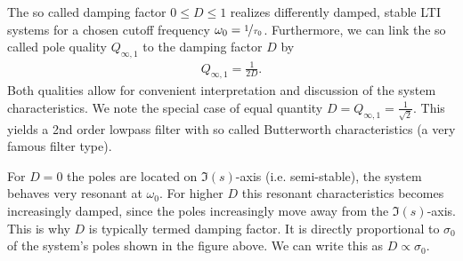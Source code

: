 \begin{mdframed}
The so called damping factor $0\leq D \leq 1$ realizes differently damped,
stable LTI systems for a chosen cutoff frequency $\omega_0=\nicefrac{1}{\tau_0}$.
Furthermore, we can link the so called pole quality $Q_{\infty,1} $ to the damping factor
$D$ by
\begin{align}
Q_{\infty,1} = \frac{1}{2 D}.
\end{align}
Both qualities allow for convenient interpretation and discussion of the
system characteristics. We note the special case of equal quantity
$D = Q_{\infty,1} = \frac{1}{\sqrt{2}}$. This yields a 2nd order
lowpass filter with so called Butterworth characteristics (a very famous filter type).
\begin{center}
%
\end{center}
%
For $D=0$ the poles are located on $\Im(s)$-axis (i.e. semi-stable),
the system behaves very resonant at $\omega_0$.
For higher $D$ this resonant characteristics becomes increasingly
damped, since the poles increasingly move away from the $\Im(s)$-axis.
%
This is why $D$ is typically termed damping factor. It is directly
proportional to $\sigma_0$ of the system's poles shown in the figure above.
We can write this as $D\propto \sigma_0$.


\end{mdframed}
